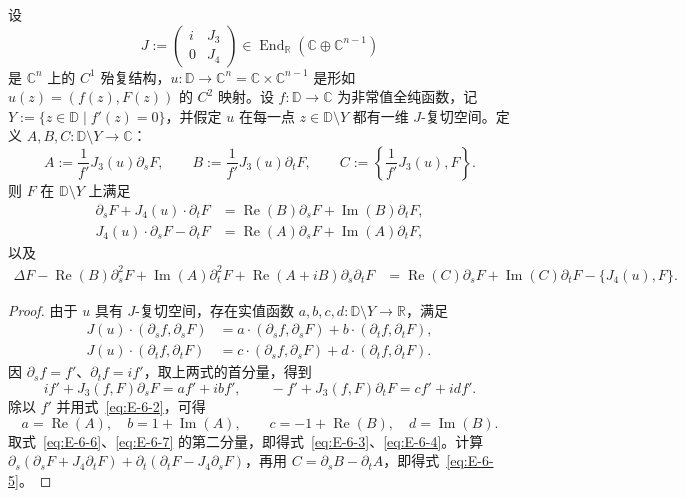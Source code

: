 \begin{lemma}\label{lem:E-6-3}
设
\begin{equation}\label{eq:E-6-1}
  J:=\begin{pmatrix}i&J_3\\0&J_4\end{pmatrix}
  \in\operatorname{End}_{\mathbb R}(\mathbb C\oplus\mathbb C^{n-1})
\end{equation}
是 $\mathbb C^n$ 上的 $C^1$ 殆复结构，$u:\mathbb D\to\mathbb C^n=\mathbb C\times\mathbb C^{n-1}$ 是形如 $u(z)=(f(z),F(z))$ 的 $C^2$ 映射。设 $f:\mathbb D\to\mathbb C$ 为非常值全纯函数，记 $Y:=\{z\in\mathbb D\mid f'(z)=0\}$，并假定 $u$ 在每一点 $z\in\mathbb D\setminus Y$ 都有一维 $J$-复切空间。定义 $A,B,C:\mathbb D\setminus Y\to\mathbb C$：
\begin{equation}\label{eq:E-6-2}
  A:=\frac1{f'}J_3(u)\partial_sF,\qquad
  B:=\frac1{f'}J_3(u)\partial_tF,\qquad
  C:=\left\{\frac1{f'}J_3(u),F\right\}.
\end{equation}
则 $F$ 在 $\mathbb D\setminus Y$ 上满足
\begin{align}
  \partial_sF+J_4(u)\cdot\partial_tF
    &=\operatorname{Re}(B)\partial_sF
       +\operatorname{Im}(B)\partial_tF,\label{eq:E-6-3}\\
  J_4(u)\cdot\partial_sF-\partial_tF
    &=\operatorname{Re}(A)\partial_sF
       +\operatorname{Im}(A)\partial_tF,\label{eq:E-6-4}
\end{align}
以及
\begin{align}
  \Delta F-\operatorname{Re}(B)\partial_s^2F
  +\operatorname{Im}(A)\partial_t^2F
  +\operatorname{Re}(A+iB)\partial_s\partial_tF
  &=\operatorname{Re}(C)\partial_sF
     +\operatorname{Im}(C)\partial_tF
     -\{J_4(u),F\}.\label{eq:E-6-5}
\end{align}
\end{lemma}

\begin{proof}
由于 $u$ 具有 $J$-复切空间，存在实值函数 $a,b,c,d:\mathbb D\setminus Y\to\mathbb R$，满足
\begin{align}
  J(u)\cdot(\partial_sf,\partial_sF)
    &=a\cdot(\partial_sf,\partial_sF)
      +b\cdot(\partial_tf,\partial_tF),\label{eq:E-6-6}\\
  J(u)\cdot(\partial_tf,\partial_tF)
    &=c\cdot(\partial_sf,\partial_sF)
      +d\cdot(\partial_tf,\partial_tF).\label{eq:E-6-7}
\end{align}
因 $\partial_sf=f'$、$\partial_tf=if'$，取上两式的首分量，得到
\[
  if'+J_3(f,F)\partial_sF=af'+ibf',\qquad
  -f'+J_3(f,F)\partial_tF=cf'+idf'.
\]
除以 $f'$ 并用式~\eqref{eq:E-6-2}，可得
\[
  a=\operatorname{Re}(A),\quad b=1+\operatorname{Im}(A),
  \qquad c=-1+\operatorname{Re}(B),\quad d=\operatorname{Im}(B).
\]
取式~\eqref{eq:E-6-6}、\eqref{eq:E-6-7} 的第二分量，即得式~\eqref{eq:E-6-3}、\eqref{eq:E-6-4}。计算 $\partial_s(\partial_sF+J_4\partial_tF)+\partial_t(\partial_tF-J_4\partial_sF)$，再用 $C=\partial_sB-\partial_tA$，即得式~\eqref{eq:E-6-5}。
\end{proof}

